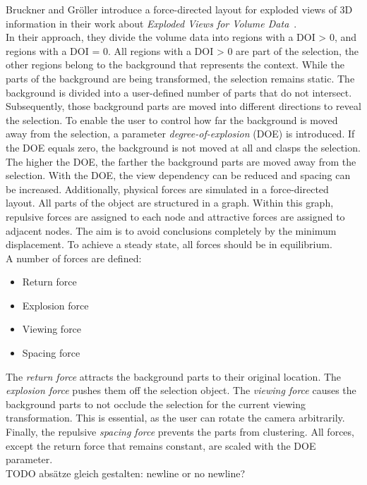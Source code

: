 \newline
Bruckner and Gr{\"o}ller introduce a force-directed layout for exploded views of 3D information in their work about \emph{Exploded Views for Volume Data}~\cite{jour:explodedView}.\\
In their approach, they divide the volume data into regions with a DOI > 0, and regions with a DOI = 0. All regions with a DOI > 0 are part of the selection, the other regions belong to the background that represents the context. While the parts of the background are being transformed, the selection remains static. The background is divided into a user-defined number of parts that do not intersect. Subsequently, those background parts are moved into different directions to reveal the selection. To enable the user to control how far the background is moved away from the selection, a parameter \emph{degree-of-explosion} (DOE) is introduced. If the DOE equals zero, the background is not moved at all and clasps the selection. The higher the DOE, the farther the background parts are moved away from the selection. With the DOE, the view dependency can be reduced and spacing can be increased. Additionally, physical forces are simulated in a force-directed layout. All parts of the object are structured in a graph. Within this graph, repulsive forces are assigned to each node and attractive forces are assigned to adjacent nodes. The aim is to avoid conclusions completely by the minimum displacement. To achieve a steady state, all forces should be in equilibrium.\\
A number of forces are defined:
\begin{itemize}
	\item Return force
	\item Explosion force
	\item Viewing force
	\item Spacing force
\end{itemize}
The \emph{return force} attracts the background parts to their original location. The \emph{explosion force} pushes them off the selection object. The \emph{viewing force} causes the background parts to not occlude the selection for the current viewing transformation. This is essential, as the user can rotate the camera arbitrarily. Finally, the repulsive \emph{spacing force} prevents the parts from clustering. All forces, except the return force that remains constant, are scaled with the DOE parameter.\\

TODO absätze gleich gestalten: newline or no newline?



